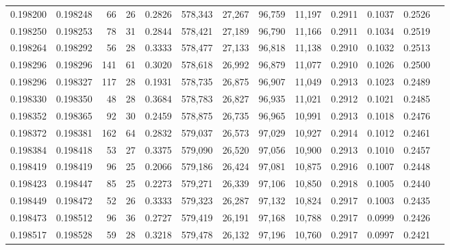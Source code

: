 \begin{tabular}{rrrrrrrrrrrrr}
0.198200 & 0.198248 &    66 &  26 &                                     0.2826 & 578,343 &  27,267 &  96,759 &  11,197 & 0.2911 & 0.1037 & 0.2526 \\
0.198250 & 0.198253 &    78 &  31 &                                     0.2844 & 578,421 &  27,189 &  96,790 &  11,166 & 0.2911 & 0.1034 & 0.2519 \\
0.198264 & 0.198292 &    56 &  28 &                                     0.3333 & 578,477 &  27,133 &  96,818 &  11,138 & 0.2910 & 0.1032 & 0.2513 \\
0.198296 & 0.198296 &   141 &  61 &                                     0.3020 & 578,618 &  26,992 &  96,879 &  11,077 & 0.2910 & 0.1026 & 0.2500 \\
0.198296 & 0.198327 &   117 &  28 &                                     0.1931 & 578,735 &  26,875 &  96,907 &  11,049 & 0.2913 & 0.1023 & 0.2489 \\
0.198330 & 0.198350 &    48 &  28 &                                     0.3684 & 578,783 &  26,827 &  96,935 &  11,021 & 0.2912 & 0.1021 & 0.2485 \\
0.198352 & 0.198365 &    92 &  30 &                                     0.2459 & 578,875 &  26,735 &  96,965 &  10,991 & 0.2913 & 0.1018 & 0.2476 \\
0.198372 & 0.198381 &   162 &  64 &                                     0.2832 & 579,037 &  26,573 &  97,029 &  10,927 & 0.2914 & 0.1012 & 0.2461 \\
0.198384 & 0.198418 &    53 &  27 &                                     0.3375 & 579,090 &  26,520 &  97,056 &  10,900 & 0.2913 & 0.1010 & 0.2457 \\
0.198419 & 0.198419 &    96 &  25 &                                     0.2066 & 579,186 &  26,424 &  97,081 &  10,875 & 0.2916 & 0.1007 & 0.2448 \\
0.198423 & 0.198447 &    85 &  25 &                                     0.2273 & 579,271 &  26,339 &  97,106 &  10,850 & 0.2918 & 0.1005 & 0.2440 \\
0.198449 & 0.198472 &    52 &  26 &                                     0.3333 & 579,323 &  26,287 &  97,132 &  10,824 & 0.2917 & 0.1003 & 0.2435 \\
0.198473 & 0.198512 &    96 &  36 &                                     0.2727 & 579,419 &  26,191 &  97,168 &  10,788 & 0.2917 & 0.0999 & 0.2426 \\
0.198517 & 0.198528 &    59 &  28 &                                     0.3218 & 579,478 &  26,132 &  97,196 &  10,760 & 0.2917 & 0.0997 & 0.2421 \\

\end{tabular}
